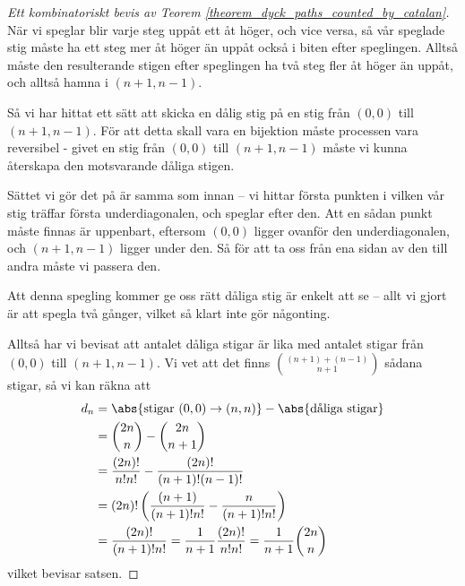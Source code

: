 \documentclass{tufte-handout}
\begin{document}
\begin{proof}[Ett kombinatoriskt bevis av Teorem \ref{theorem_dyck_paths_counted_by_catalan}]
    När vi speglar blir varje steg uppåt ett åt höger, och vice versa, så vår speglade stig måste ha ett steg mer åt höger än uppåt också i biten efter speglingen. Alltså måste den resulterande stigen efter speglingen ha två steg fler åt höger än uppåt, och alltså hamna i $(n+1,n-1)$.

    Så vi har hittat ett sätt att skicka en dålig stig på en stig från $(0,0)$ till $(n+1,n-1)$. För att detta skall vara en bijektion måste processen vara reversibel - givet en stig från $(0,0)$ till $(n+1,n-1)$ måste vi kunna återskapa den motsvarande dåliga stigen.

    Sättet vi gör det på är samma som innan -- vi hittar första punkten i vilken vår stig träffar första underdiagonalen, och speglar efter den. Att en sådan punkt måste finnas är uppenbart, eftersom $(0,0)$ ligger ovanför den underdiagonalen, och $(n+1,n-1)$ ligger under den. Så för att ta oss från ena sidan av den till andra måste vi passera den.

    Att denna spegling kommer ge oss rätt dåliga stig är enkelt att se -- allt vi gjort är att spegla två gånger, vilket så klart inte gör någonting.

    Alltså har vi bevisat att antalet dåliga stigar är lika med antalet stigar från $(0,0)$ till $(n+1,n-1)$. Vi vet att det finns $\binom{(n + 1) + (n - 1)}{n+1}$ sådana stigar, så vi kan räkna att
    \begin{align*}
        d_n &= \abs{\text{stigar }(0,0)\to(n,n)} - \abs{\text{dåliga stigar}}\\
        &= \binom{2n}{n} - \binom{2n}{n+1}\\
        &= \frac{(2n)!}{n!n!} - \frac{(2n)!}{(n+1)!(n-1)!}\\
        &= (2n)!\left(\frac{(n+1)}{(n+1)!n!} - \frac{n}{(n+1)!n!}\right)\\
        &= \frac{(2n)!}{(n+1)!n!} = \frac{1}{n+1}\frac{(2n)!}{n!n!} = \frac{1}{n+1}\binom{2n}{n}
    \end{align*}
    vilket bevisar satsen.
\end{proof}
\end{document}
